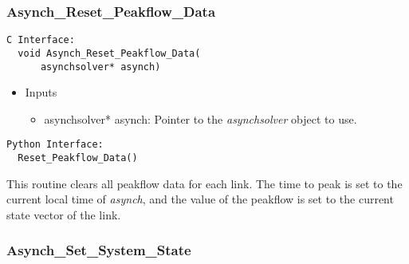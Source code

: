 \documentclass[12pt]{article}
\begin{document}
\subsubsection{Asynch\_Reset\_Peakflow\_Data} \label{sec: asynch_reset_peakflow_data}

\begin{lstlisting}[style=CStyle]
  C Interface:
  void Asynch_Reset_Peakflow_Data(
      asynchsolver* asynch)
\end{lstlisting}
\begin{itemize}
 \item Inputs
  \begin{itemize}
   \item asynchsolver* asynch: Pointer to the \emph{asynchsolver} object to use.
  \end{itemize}
\end{itemize}
\begin{lstlisting}[style=PythonStyle]
  Python Interface:
  Reset_Peakflow_Data()
\end{lstlisting}
This routine clears all peakflow data for each link. The time to peak is set to the current local time of \emph{asynch}, and the value of the peakflow is set to the current state vector of the link.


\subsubsection{Asynch\_Set\_System\_State} \label{sec: asynch_set_system_state}
\end{document}
